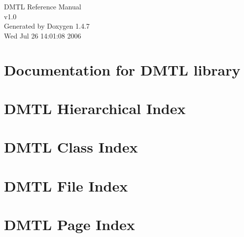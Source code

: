 \documentclass[a4paper]{book}
\begin{document}
\begin{titlepage}
\vspace*{7cm}
\begin{center}
{\Large DMTL Reference Manual\\[1ex]\large v1.0 }\\
\vspace*{1cm}
{\large Generated by Doxygen 1.4.7}\\
\vspace*{0.5cm}
{\small Wed Jul 26 14:01:08 2006}\\
\end{center}
\end{titlepage}
\clearemptydoublepage
{}
\tableofcontents
\clearemptydoublepage
{}
\chapter{Documentation for DMTL library }
\label{index}
\chapter{DMTL Hierarchical Index}

\chapter{DMTL Class Index}

\chapter{DMTL File Index}

\chapter{DMTL Page Index}

\end{document}
